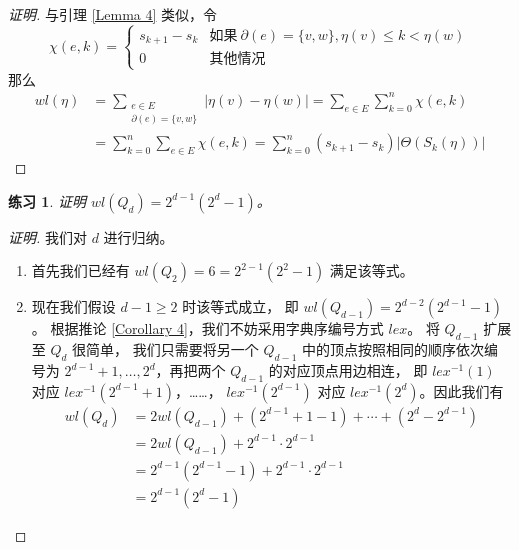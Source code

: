 \documentclass[12pt, a4paper]{article}
\newtheorem{exercisewithanswer}{练习}
\begin{document}
\begin{proof}[证明]
与引理 \ref{Lemma 4} 类似，令
\begin{equation*}
\chi(e, k) = \begin{cases}
	s_{k + 1} - s_k & \text{如果}\ \partial(e) = \{v, w\}, \eta(v) \le k < \eta(w) \\
	0               & \text{其他情况}
\end{cases}
\end{equation*}
那么
\begin{align*}
wl(\eta) & = \sum_{\substack{
		     e \in E \\
		     \partial(e) = \{v, w\}
	     }} |\eta(v) - \eta(w)| = \sum_{e \in E} \sum_{k = 0}^n \chi(e, k) \\
	 & = \sum_{k = 0}^n \sum_{e \in E} \chi(e, k)
	   = \sum_{k = 0}^n (s_{k + 1} - s_k) |\Theta(S_k(\eta))|
\end{align*}
\end{proof}

\begin{exercisewithanswer}
证明 $wl(Q_d) = 2^{d - 1} (2^d - 1)$。
\end{exercisewithanswer}

\begin{proof}[证明]
我们对 $d$ 进行归纳。
\begin{enumerate}[(1)]
	\item 首先我们已经有 $wl(Q_2) = 6 = 2^{2 - 1} (2^2 - 1)$ 满足该等式。
	\item 现在我们假设 $d - 1 \ge 2$ 时该等式成立，
		即 $wl(Q_{d - 1}) = 2^{d - 2} (2^{d - 1} - 1)$。
		根据推论 \ref{Corollary 4}，我们不妨采用字典序编号方式 $lex$。
		将 $Q_{d - 1}$ 扩展至 $Q_d$ 很简单，
		我们只需要将另一个 $Q_{d - 1}$ 中的顶点按照相同的顺序依次编号为
		$2^{d - 1} + 1, \dots, 2^d$，再把两个 $Q_{d - 1}$ 的对应顶点用边相连，
		即 $lex^{-1}(1)$ 对应 $lex^{-1}(2^{d - 1} + 1)$，……，
		$lex^{-1}(2^{d - 1})$ 对应 $lex^{-1}(2^d)$。因此我们有
		\begin{align*}
		wl(Q_d) & = 2 wl(Q_{d - 1}) + \left(2^{d - 1} + 1 - 1\right) +
			    \cdots + \left(2^d - 2^{d - 1}\right) \\
			& = 2 wl(Q_{d - 1}) + 2^{d - 1} \cdot 2^{d - 1} \\
			& = 2^{d - 1} (2^{d - 1} - 1) + 2^{d - 1} \cdot 2^{d - 1} \\
			& = 2^{d - 1} (2^d - 1)
		\end{align*}
\end{enumerate}
\end{proof}
\end{document}

